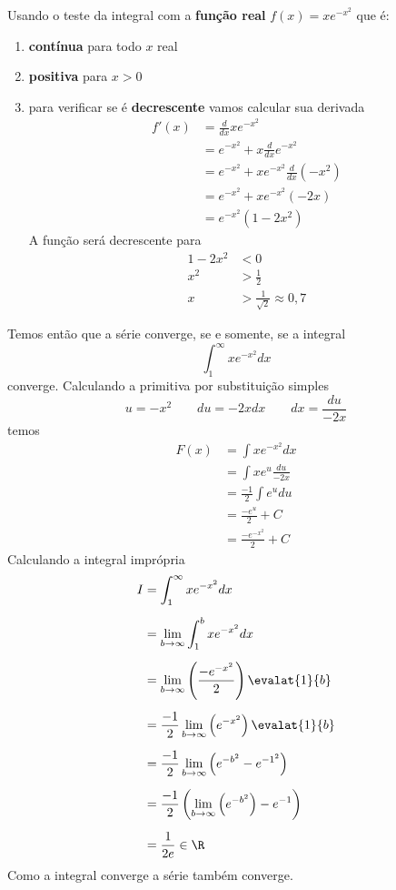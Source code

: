 \documentclass[a4paper,12pt,fleqn]{article}
\begin{document}
\begin{answer}
  Usando o teste da integral com a \textbf{função real} \(f(x)=xe^{-x^2}\) que é:
  \begin{enumerate}
    \item \textbf{contínua} para todo $x$ real
    \item \textbf{positiva} para $x>0$
    \item para verificar se é \textbf{decrescente} vamos calcular sua derivada
    \begin{align*}
      f'(x)
      & = \frac{d}{dx}xe^{-x^2} \\[2mm]
      & = e^{-x^2} + x\frac{d}{dx}e^{-x^2} \\[2mm]
      & = e^{-x^2} + xe^{-x^2}\frac{d}{dx}\left(-x^2\right) \\[2mm]
      & = e^{-x^2} + xe^{-x^2}(-2x) \\[2mm]
      & = e^{-x^2}\left(1 - 2x^2\right)
    \end{align*}
    A função será decrescente para
    \begin{align*}
      1 - 2 x^2 & < 0                              \\
      x^2       & > \frac{1}{2}                    \\
      x         & > \frac{1}{\sqrt{2}} \approx 0,7
    \end{align*}
  \end{enumerate}
  Temos então que a série converge, se e somente, se a integral
  \[
    \int_1^\infty xe^{-x^2} dx
  \]
  converge.
  Calculando a primitiva por substituição simples
  \[
    u = -x^2
    \qquad
    du = -2xdx
    \qquad
    dx = \frac{du}{-2x}
  \]
  temos
  \begin{align*}
    F(x)
    & = \int xe^{-x^2} dx \\[2mm]
    & = \int xe^u \frac{du}{-2x} \\[2mm]
    & = \frac{-1}{2}\int e^u du \\[2mm]
    & = \frac{-e^u}{2} + C \\[2mm]
    & = \frac{-e^{-x^2}}{2} + C
  \end{align*}
  Calculando a integral imprópria
  \begin{align*}
    I
    & = \int_1^\infty xe^{-x^2} dx \\[2mm]
    & = \lim_{b\to\infty}\int_1^b xe^{-x^2} dx \\[2mm]
    & = \lim_{b\to\infty}\left(\frac{-e^{-x^2}}{2}\right)\evalat{1}{b} \\[2mm]
    & = \frac{-1}{2}\lim_{b\to\infty}\left(e^{-x^2}\right)\evalat{1}{b} \\[2mm]
    & = \frac{-1}{2}\lim_{b\to\infty}\left(e^{-b^2}-e^{-1^2}\right) \\[2mm]
    & = \frac{-1}{2}\left(\lim_{b\to\infty}\left(e^{-b^2}\right)-e^{-1}\right) \\[2mm]
    & = \frac{1}{2e} \in \R
  \end{align*}
  Como a integral converge a série também converge.
\end{answer}
\end{document}
